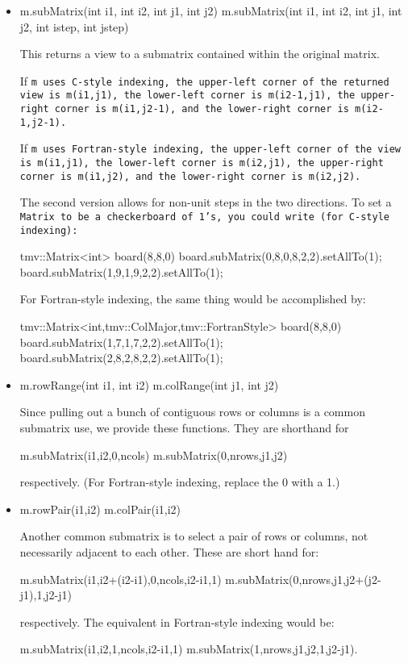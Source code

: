 \begin{itemize}
\item
\begin{tmvcode}
m.subMatrix(int i1, int i2, int j1, int j2)
m.subMatrix(int i1, int i2, int j1, int j2, int istep, int jstep)
\end{tmvcode}
This returns a view to a submatrix contained within the original matrix.

If \tt{m} uses C-style indexing, 
the upper-left corner of the returned view is \tt{m(i1,j1)},
the lower-left corner is \tt{m(i2-1,j1)},
the upper-right corner is \tt{m(i1,j2-1)}, and
the lower-right corner is \tt{m(i2-1,j2-1)}.

If \tt{m} uses Fortran-style indexing, 
the upper-left corner of the view is \tt{m(i1,j1)},
the lower-left corner is \tt{m(i2,j1)},
the upper-right corner is \tt{m(i1,j2)}, and
the lower-right corner is \tt{m(i2,j2)}.

The second version allows for non-unit steps in the two directions.
To set a \tt{Matrix} to be a checkerboard of 1's, you could write 
(for C-style indexing):
\begin{tmvcode}
tmv::Matrix<int> board(8,8,0)
board.subMatrix(0,8,0,8,2,2).setAllTo(1);
board.subMatrix(1,9,1,9,2,2).setAllTo(1);
\end{tmvcode}

For Fortran-style indexing, the same thing would be accomplished by:
\begin{tmvcode}
tmv::Matrix<int,tmv::ColMajor,tmv::FortranStyle> board(8,8,0)
board.subMatrix(1,7,1,7,2,2).setAllTo(1);
board.subMatrix(2,8,2,8,2,2).setAllTo(1);
\end{tmvcode}

\item
\begin{tmvcode}
m.rowRange(int i1, int i2)
m.colRange(int j1, int j2)
\end{tmvcode}
Since pulling out a bunch of contiguous rows or columns is a common 
submatrix use, we provide these functions.  They are shorthand for
\begin{tmvcode}
m.subMatrix(i1,i2,0,ncols)
m.subMatrix(0,nrows,j1,j2)
\end{tmvcode}
respectively.  (For Fortran-style indexing, replace the 0 with a 1.)

\item
\begin{tmvcode}
m.rowPair(i1,i2)
m.colPair(i1,i2)
\end{tmvcode}
Another common submatrix is to select a pair of rows or columns, not 
necessarily adjacent to each other.  These are short hand for:
\begin{tmvcode}
m.subMatrix(i1,i2+(i2-i1),0,ncols,i2-i1,1)
m.subMatrix(0,nrows,j1,j2+(j2-j1),1,j2-j1)
\end{tmvcode}
respectively.  The equivalent in Fortran-style indexing would be:
\begin{tmvcode}
m.subMatrix(i1,i2,1,ncols,i2-i1,1)
m.subMatrix(1,nrows,j1,j2,1,j2-j1).
\end{tmvcode}


\end{itemize}
